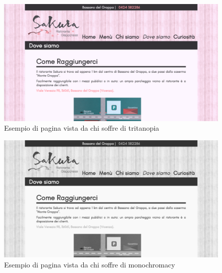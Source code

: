 \documentclass[../relazione.tex]{subfiles}
\begin{document}
	\begin{figure}[H]
	\centering
		\includegraphics[width=\textwidth]{images/colorblindness/tritanopia}
		\caption{Esempio di pagina vista da chi soffre di tritanopia}
		\label{fig:Esempio di pagina vista da chi soffre di tritanopia}
	\end{figure}
	\begin{figure}[H]
	\centering
		\includegraphics[width=\textwidth]{images/colorblindness/monochromacy}
		\caption{Esempio di pagina vista da chi soffre di monochromacy}
		\label{fig:Esempio di pagina vista da chi soffre di monochromacy}
	\end{figure}
\end{document}
